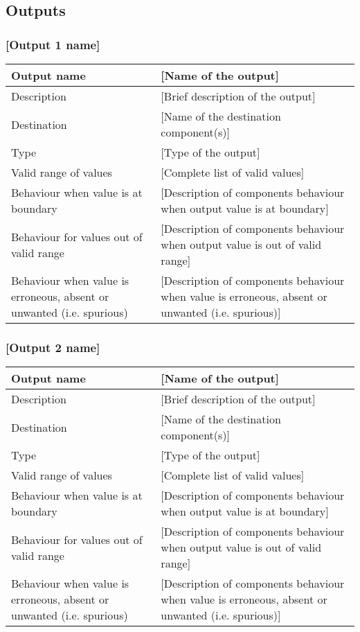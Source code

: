 \subsection{Outputs}\label{s:template_outputs}

\subsubsection{[Output 1 name]}

\begin{longtable}{p{}p{}}
\toprule
Output name				& [Name of the output] \\
\midrule
Description				& [Brief description of the output] \\
\midrule
Destination				& [Name of the destination component(s)] \\ 
\midrule
Type					& [Type of the output] \\
\midrule
Valid range of values	& [Complete list of valid values] \\
\midrule
Behaviour when value is at boundary	& [Description of components behaviour when output value is at boundary] \\
\midrule
Behaviour for values out of valid range	& [Description of components behaviour when output value is out of valid range] \\
\midrule
Behaviour when value is erroneous, absent or unwanted (i.e. spurious) & [Description of components behaviour when value is erroneous, absent or unwanted (i.e. spurious)] \\
\bottomrule
\end{longtable}


\subsubsection{[Output 2 name]}

\begin{longtable}{p{}p{}}
\toprule
Output name				& [Name of the output] \\
\midrule
Description				& [Brief description of the output] \\
\midrule
Destination				& [Name of the destination component(s)] \\ 
\midrule
Type					& [Type of the output] \\
\midrule
Valid range of values	& [Complete list of valid values] \\
\midrule
Behaviour when value is at boundary	& [Description of components behaviour when output value is at boundary] \\
\midrule
Behaviour for values out of valid range	& [Description of components behaviour when output value is out of valid range] \\
\midrule
Behaviour when value is erroneous, absent or unwanted (i.e. spurious) & [Description of components behaviour when value is erroneous, absent or unwanted (i.e. spurious)] \\
\bottomrule
\end{longtable}
